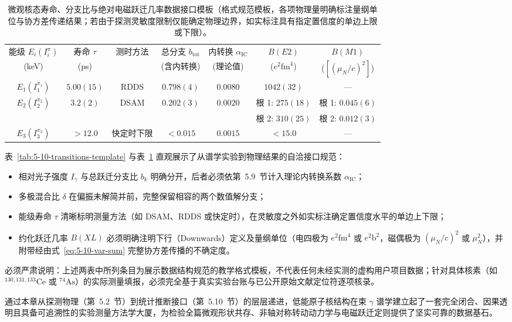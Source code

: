 \begin{table}[!htbp]
\centering\footnotesize
\caption{微观核态寿命、分支比与绝对电磁跃迁几率数据接口模板（格式规范模板，各项物理量明确标注量纲单位与协方差传递结果；若由于探测灵敏度限制仅能确定物理边界，如实标注具有指定置信度的单边上限或下限）。}
\label{tab:5-10-strengths-template}
\begin{tabular*}{\textwidth}{@{\extracolsep{\fill}}ccccccc@{}}
\toprule
能级 $E_i(I_i^{\pi})$ & 寿命 $\tau$ & 测时方法 & 总分支 $b_{\mathrm{tot}}$ & 内转换 $\alpha_{\mathrm{IC}}$ & $B(E2)$ & $B(M1)$ \\
(keV) & (ps) & & (含内转换) & (理论值) & ($e^2\text{fm}^4$) & ($[(\mu_N/c)^2]$) \\
\midrule
$E_1(I_1^{\pi_1})$ & $5.00(15)$ & RDDS & $0.798(4)$ & $0.0080$ & $1042(32)$ & --- \\
$E_2(I_2^{\pi_2})$ & $3.2(2)$ & DSAM & $0.202(3)$ & $0.0020$ & 根 1: $275(18)$ & 根 1: $0.045(6)$ \\
& & & & & 根 2: $310(25)$ & 根 2: $0.012(3)$ \\
$E_3(I_3^{\pi_3})$ & $> 12.0$ & 快定时下限 & $< 0.015$ & $0.0015$ & $< 15.0$ & --- \\
\bottomrule
\end{tabular*}
\end{table}

表~\ref{tab:5-10-transitions-template} 与表~\ref{tab:5-10-strengths-template} 直观展示了从谱学实验到物理结果的自洽接口规范：
\begin{itemize}
\item 相对光子强度 $I_\gamma$ 与总跃迁分支比 $b_k$ 明确分开，后者必须依第~5.9~节计入理论内转换系数 $\alpha_{\mathrm{IC}}$；
\item 多极混合比 $\delta$ 在偏振未解简并前，完整保留相容的两个数值解分支；
\item 能级寿命 $\tau$ 清晰标明测量方法（如 DSAM、RDDS 或快定时），在灵敏度之外如实标注确定置信度水平的单边上下限；
\item 约化跃迁几率 $B(XL)$ 必须明确注明下行（Downwards）定义及量纲单位（电四极为 $e^2\text{fm}^4$ 或 $e^2\text{b}^2$，磁偶极为 $(\mu_N/c)^2$ 或 $\mu_N^2$），并附带经由式~\eqref{eq:5-10-var-sum} 完整协方差传播的不确定度。
\end{itemize}
必须严肃说明：上述两表中所列条目为展示数据结构规范的教学格式模板，不代表任何未经实测的虚构用户项目数据；针对具体核素（如 $^{130, 131, 133}\mathrm{Ce}$ 或 $^{74}\mathrm{As}$）的实际测量填报，必须完全基于真实实验台账与已公开原始文献定位符逐项核录。

通过本章从探测物理（第~5.2~节）到统计推断接口（第~5.10~节）的层层递进，低能原子核结构在束 $\gamma$ 谱学建立起了一套完全闭合、因果透明且具备可追溯性的实验测量方法学大厦，为检验全篇微观形状共存、非轴对称转动动力学与电磁跃迁定则提供了坚实可靠的数据基石。
